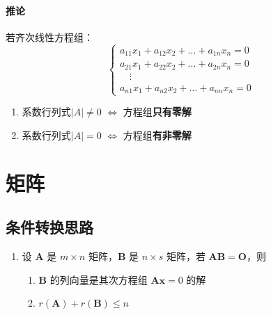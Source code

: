 \documentclass[a4paper,12pt]{article}
\begin{document}
    \paragraph{推论} 若齐次线性方程组：
    \[
        \begin{cases}
            a_{11}x_1 + a_{12}x_2 + \dots + a_{1n}x_n = 0 \\
            a_{21}x_1 + a_{22}x_2 + \dots + a_{2n}x_n = 0 \\
            \quad \vdots \\
            a_{n1}x_1 + a_{n2}x_2 + \dots + a_{nn}x_n = 0
        \end{cases}
    \]

    \begin{enumerate}
        \item 系数行列式$|A| \neq 0$ $\Leftrightarrow$ 方程组\textbf{只有零解}
        \item 系数行列式$|A| = 0$ $\Leftrightarrow$ 方程组\textbf{有非零解}
    \end{enumerate}


    \section{矩阵}

    \subsection{条件转换思路}

    \begin{enumerate}
        \item 设 $\mathbf{A}$ 是 $m \times n$ 矩阵，$\mathbf{B}$ 是 $n \times s$ 矩阵，若 $\mathbf{AB} = \mathbf{O}$，则
        \begin{enumerate}
            \item $\mathbf{B}$ 的列向量是其次方程组 $\mathbf{Ax} = 0$ 的解
            \item $r(\mathbf{A}) + r(\mathbf{B}) \le n$
        \end{enumerate}
    \end{enumerate}
\end{document}
